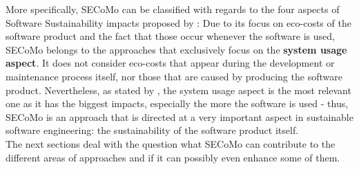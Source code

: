 More specifically, SECoMo can be classified with regards to the four aspects of Software Sustainability impacts proposed by \cite{penzenstadler_supporting_2012}: Due to its focus on eco-costs of the software product and the fact that those occur whenever the software is used, SECoMo belongs to the approaches that exclusively focus on the \textbf{system usage aspect}. It does not consider eco-costs that appear during the development or maintenance process itself, nor those that are caused by producing the software product. Nevertheless, as stated by \cite{penzenstadler_what_13}, the system usage aspect is the most relevant one as it has the biggest impacts, especially the more the software is used - thus, SECoMo is an approach that is directed at a very important aspect in sustainable software engineering: the sustainability of the software product itself.\\
The next sections deal with the question what SECoMo can contribute to the different areas of approaches and if it can possibly even enhance some of them.

